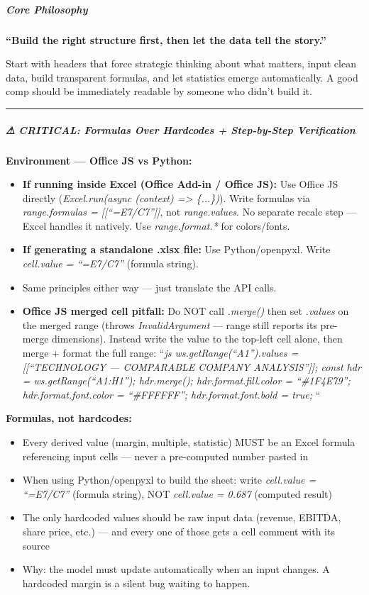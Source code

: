 \documentclass[11pt]{article}
\begin{document}
\subparagraph{Core Philosophy}\mbox{}\par
\textbf{``Build the right structure first, then let the data tell the story.''}


Start with headers that force strategic thinking about what matters, input clean data, build transparent formulas, and let statistics emerge automatically. A good comp should be immediately readable by someone who didn't build it.


\vspace{0.5em}\hrule\vspace{0.5em}

\subparagraph{⚠ CRITICAL: Formulas Over Hardcodes + Step-by-Step Verification}\mbox{}\par

\textbf{Environment — Office JS vs Python:}

\begin{itemize}[leftmargin=*,itemsep=2pt,topsep=2pt]
\item {} \textbf{If running inside Excel (Office Add-in / Office JS):} Use Office JS directly (\emph{Excel.run(async (context) => \{...\})}). Write formulas via \emph{range.formulas = [[``=E7/C7'']]}, not \emph{range.values}. No separate recalc step — Excel handles it natively. Use \emph{range.format.*} for colors/fonts.
\item {} \textbf{If generating a standalone .xlsx file:} Use Python/openpyxl. Write \emph{cell.value = ``=E7/C7''} (formula string).
\item {} Same principles either way — just translate the API calls.
\item {} \textbf{Office JS merged cell pitfall:} Do NOT call \emph{.merge()} then set \emph{.values} on the merged range (throws \emph{InvalidArgument} — range still reports its pre-merge dimensions). Instead write the value to the top-left cell alone, then merge + format the full range: ``\emph{js ws.getRange(``A1'').values = [[``TECHNOLOGY — COMPARABLE COMPANY ANALYSIS'']]; const hdr = ws.getRange(``A1:H1''); hdr.merge(); hdr.format.fill.color = ``\#1F4E79''; hdr.format.font.color = ``\#FFFFFF''; hdr.format.font.bold = true; }``
\end{itemize}

\textbf{Formulas, not hardcodes:}

\begin{itemize}[leftmargin=*,itemsep=2pt,topsep=2pt]
\item {} Every derived value (margin, multiple, statistic) MUST be an Excel formula referencing input cells — never a pre-computed number pasted in
\item {} When using Python/openpyxl to build the sheet: write \emph{cell.value = ``=E7/C7''} (formula string), NOT \emph{cell.value = 0.687} (computed result)
\item {} The only hardcoded values should be raw input data (revenue, EBITDA, share price, etc.) — and every one of those gets a cell comment with its source
\item {} Why: the model must update automatically when an input changes. A hardcoded margin is a silent bug waiting to happen.
\end{itemize}
\end{document}
